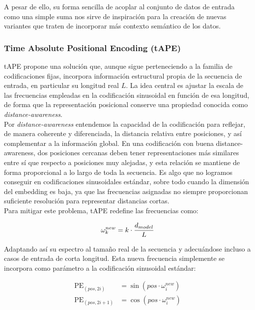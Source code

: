 A pesar de ello, su forma sencilla de acoplar al conjunto de datos de entrada como una simple suma nos sirve de inspiración para la creación de nuevas variantes que traten de incorporar más contexto semántico de los datos.

\subsubsection{Time Absolute Positional Encoding (tAPE)}

tAPE propone una solución que, aunque sigue perteneciendo a la familia de codificaciones fijas, incorpora información estructural propia de la secuencia de entrada, en particular su longitud real $L$. La idea central es ajustar la escala de las frecuencias empleadas en la codificación sinusoidal en función de esa longitud, de forma que la representación posicional conserve una propiedad conocida como \textit{distance-awareness}.\\

Por \textit{distance-awareness} entendemos la capacidad de la codificación para reflejar, de manera coherente y diferenciada, la distancia relativa entre posiciones, y así complementar a la información global. En una codificación con buena distance-awareness, dos posiciones cercanas deben tener representaciones más similares entre sí que respecto a posiciones muy alejadas, y esta relación se mantiene de forma proporcional a lo largo de toda la secuencia. Es algo que no logramos conseguir en codificaciones sinusoidales estándar, sobre todo cuando la dimensión del embedding es baja, ya que las frecuencias asignadas no siempre proporcionan suficiente resolución para representar distancias cortas.\\

Para mitigar este problema, tAPE redefine las frecuencias como:

\begin{equation}
	\centering
	\omega^{new}_k = k \cdot \frac{d_{model}}{L}
\end{equation}

Adaptando así su espectro al tamaño real de la secuencia y adecuándose incluso a casos de entrada de corta longitud. Esta nueva frecuencia simplemente se incorpora como parámetro a la codificación sinusoidal estándar:

\begin{equation}
	\begin{aligned}
		\text{PE}_{(pos,2i)} &= \sin\!\left( pos \cdot \omega^{new}_i \right) \\
		\text{PE}_{(pos,2i+1)} &= \cos\!\left( pos \cdot \omega^{new}_i \right)
	\end{aligned}
\end{equation}


